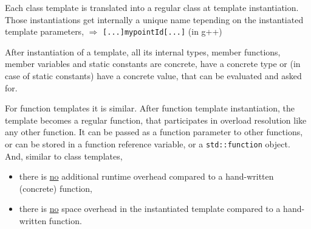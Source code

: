 Each class template is translated into a regular class at template instantiation. Those instantiations get internally a unique name tepending on the
instantiated template parameters, \eg {} $\Rightarrow$ \texttt{[...]mypointId[...]} (in g++)

After instantiation of a template, all its internal types, member functions, member variables and static constants are concrete, have a concrete type
or (in case of static constants) have a concrete value, that can be evaluated and asked for.

For function templates it is similar. After function template instantiation, the template becomes a regular function, that participates in overload
resolution like any other function. It can be passed as a function parameter to other functions, or can be stored in a function reference variable,
or a \texttt{std::function} object. And, similar to class templates,
\begin{itemize}
  \item there is \underline{no} additional runtime overhead compared to a hand-written (concrete) function,
  \item there is \underline{no} space overhead in the instantiated template compared to a hand-written function.
\end{itemize}
